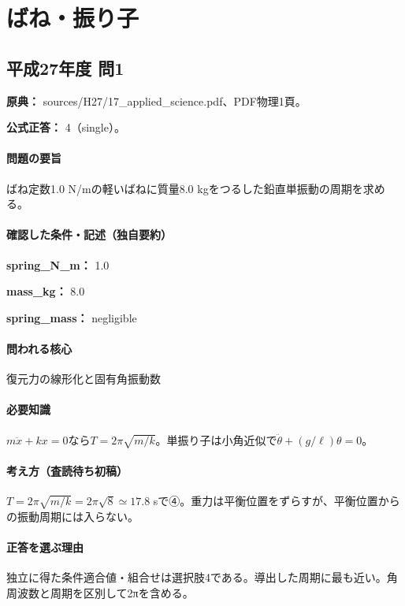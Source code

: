 \section{ばね・振り子}

\subsection{平成27年度 問1}
\label{q:h27-reg-applied-01}

\noindent\textbf{原典：} sources/H27/17\_applied\_science.pdf、PDF物理1頁。

\textbf{公式正答：} 4（single）。

\paragraph{問題の要旨} ばね定数1.0 N/mの軽いばねに質量8.0 kgをつるした鉛直単振動の周期を求める。

\paragraph{確認した条件・記述（独自要約）}\mbox{}\par

\noindent\textbf{spring\_N\_m：} 1.0\par

\noindent\textbf{mass\_kg：} 8.0\par

\noindent\textbf{spring\_mass：} negligible\par

\paragraph{問われる核心} 復元力の線形化と固有角振動数

\paragraph{必要知識} \(m\ddot x+kx=0\)なら\(T=2\pi\sqrt{m/k}\)。単振り子は小角近似で\(\ddot\theta+(g/\ell)\theta=0\)。

\paragraph{考え方（査読待ち初稿）} \(T=2\pi\sqrt{m/k}=2\pi\sqrt8\simeq17.8\) sで④。重力は平衡位置をずらすが、平衡位置からの振動周期には入らない。

\paragraph{正答を選ぶ理由} 独立に得た条件適合値・組合せは選択肢4である。導出した周期に最も近い。角周波数と周期を区別して2πを含める。


